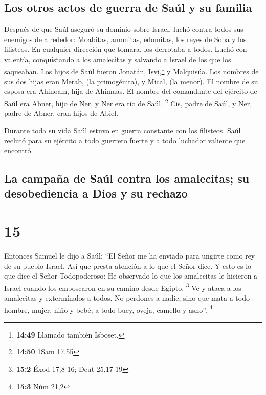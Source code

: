 \hypertarget{los-otros-actos-de-guerra-de-sauxfal-y-su-familia}{%
\subsection{Los otros actos de guerra de Saúl y su
familia}\label{los-otros-actos-de-guerra-de-sauxfal-y-su-familia}}

 Después de que Saúl aseguró su dominio sobre Israel,
luchó contra todos sus enemigos de alrededor: Moabitas, amonitas,
edomitas, los reyes de Soba y los filisteos. En cualquier dirección que
tomara, los derrotaba a todos.  Luchó con valentía,
conquistando a los amalecitas y salvando a Israel de los que los
saqueaban.  Los hijos de Saúl fueron Jonatán,
Isvi,\footnote{\textbf{14:49} Llamado también Isboset.} y Malquisúa. Los
nombres de sus dos hijas eran Merab, (la primogénita), y Mical, (la
menor).  El nombre de su esposa era Ahinoam, hija de
Ahimaas. El nombre del comandante del ejército de Saúl era Abner, hijo
de Ner, y Ner era tío de Saúl. \footnote{\textbf{14:50} 1Sam 17,55}
 Cis, padre de Saúl, y Ner, padre de Abner, eran hijos de
Abiel.

 Durante toda su vida Saúl estuvo en guerra constante con
los filisteos. Saúl reclutó para su ejército a todo guerrero fuerte y a
todo luchador valiente que encontró.

\hypertarget{la-campauxf1a-de-sauxfal-contra-los-amalecitas-su-desobediencia-a-dios-y-su-rechazo}{%
\subsection{La campaña de Saúl contra los amalecitas; su desobediencia a
Dios y su
rechazo}\label{la-campauxf1a-de-sauxfal-contra-los-amalecitas-su-desobediencia-a-dios-y-su-rechazo}}

\hypertarget{section-14}{%
\section{15}\label{section-14}}

 Entonces Samuel le dijo a Saúl: ``El Señor me ha enviado
para ungirte como rey de su pueblo Israel. Así que presta atención a lo
que el Señor dice.  Y esto es lo que dice el Señor
Todopoderoso: He observado lo que los amalecitas le hicieron a Israel
cuando los emboscaron en su camino desde Egipto. \footnote{\textbf{15:2}
  Éxod 17,8-16; Deut 25,17-19}  Ve y ataca a los
amalecitas y extermínalos a todos. No perdones a nadie, sino que mata a
todo hombre, mujer, niño y bebé; a todo buey, oveja, camello y asno''.
\footnote{\textbf{15:3} Núm 21,2}


